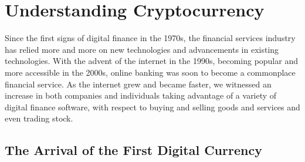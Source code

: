 \chapter{Understanding Cryptocurrency}\label{understandingcryptocurrencych}

Since the first signs of digital finance in the 1970s, the financial services industry has relied more and more on new technologies and advancements in existing technologies. With the advent of the internet in the 1990s, becoming popular and more accessible in the 2000s, online banking was soon to become a commonplace financial service. As the internet grew and became faster, we witnessed an increase in both companies and individuals taking advantage of a variety of digital finance software, with respect to buying and selling goods and services and even trading stock.

\section{The Arrival of the First Digital Currency}\label{secfirstcrypto}

